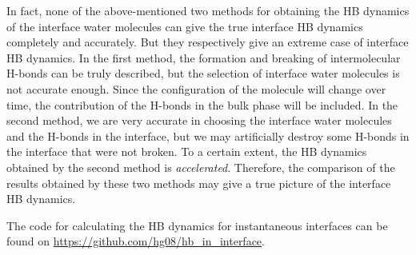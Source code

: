 In fact, none of the above-mentioned two methods for obtaining the HB dynamics of the interface water molecules 
can give the true interface HB dynamics completely and accurately. But they respectively give an extreme case of interface HB dynamics. 
In the first method, the formation and breaking of intermolecular H-bonds can be truly described, 
but the selection of interface water molecules is not accurate enough. Since the configuration of the molecule will change over time, 
the contribution of the H-bonds in the bulk phase will be included. 
In the second method, we are very accurate in choosing the interface water molecules and the H-bonds in the interface, 
but we may artificially destroy some H-bonds in the interface that were not broken. 
To a certain extent, the HB dynamics obtained by the second method is \emph{accelerated}. 
Therefore, the comparison of the results obtained by these two methods may give a true picture of the interface HB dynamics.

The code for calculating the HB dynamics for instantaneous interfaces can be found on \url{https://github.com/hg08/hb_in_interface}. 

